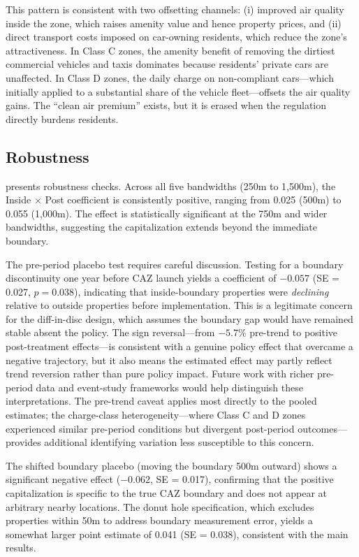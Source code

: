 \documentclass[12pt]{article}
\begin{document}
This pattern is consistent with two offsetting channels: (i) improved air quality inside the zone, which raises amenity value and hence property prices, and (ii) direct transport costs imposed on car-owning residents, which reduce the zone's attractiveness. In Class C zones, the amenity benefit of removing the dirtiest commercial vehicles and taxis dominates because residents' private cars are unaffected. In Class D zones, the daily charge on non-compliant cars---which initially applied to a substantial share of the vehicle fleet---offsets the air quality gains. The ``clean air premium'' exists, but it is erased when the regulation directly burdens residents.

\subsection{Robustness}



 presents robustness checks. Across all five bandwidths (250m to 1,500m), the Inside $\times$ Post coefficient is consistently positive, ranging from 0.025 (500m) to 0.055 (1,000m). The effect is statistically significant at the 750m and wider bandwidths, suggesting the capitalization extends beyond the immediate boundary.

The pre-period placebo test requires careful discussion. Testing for a boundary discontinuity one year before CAZ launch yields a coefficient of $-0.057$ (SE = 0.027, $p = 0.038$), indicating that inside-boundary properties were \textit{declining} relative to outside properties before implementation. This is a legitimate concern for the diff-in-disc design, which assumes the boundary gap would have remained stable absent the policy. The sign reversal---from $-5.7\%$ pre-trend to positive post-treatment effects---is consistent with a genuine policy effect that overcame a negative trajectory, but it also means the estimated effect may partly reflect trend reversion rather than pure policy impact. Future work with richer pre-period data and event-study frameworks would help distinguish these interpretations. The pre-trend caveat applies most directly to the pooled estimates; the charge-class heterogeneity---where Class C and D zones experienced similar pre-period conditions but divergent post-period outcomes---provides additional identifying variation less susceptible to this concern.

The shifted boundary placebo (moving the boundary 500m outward) shows a significant negative effect ($-0.062$, SE = 0.017), confirming that the positive capitalization is specific to the true CAZ boundary and does not appear at arbitrary nearby locations. The donut hole specification, which excludes properties within 50m to address boundary measurement error, yields a somewhat larger point estimate of 0.041 (SE = 0.038), consistent with the main results.
\end{document}

